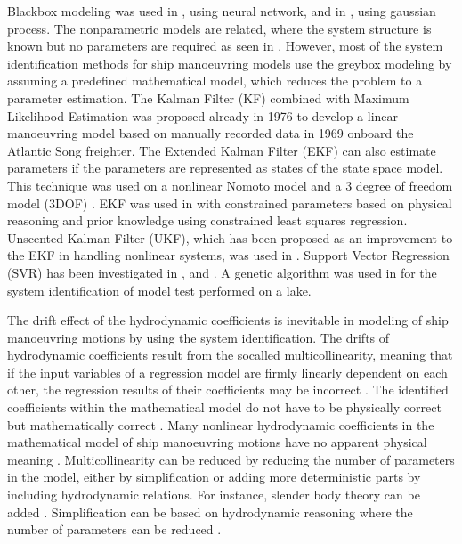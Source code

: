 \documentclass[review]{elsarticle}
\begin{document}
\sphinxAtStartPar
Black\sphinxhyphen{}box modeling was used in \cite{he_nonparametric_2022}, using neural network, and in \cite{xue_identification_2021}, using gaussian process. The nonparametric models are related, where the system structure is known but no parameters are required as seen in \cite{pongduang_nonparametric_2020}. However, most of the system identification methods for ship manoeuvring models use the grey\sphinxhyphen{}box modeling by assuming a predefined mathematical model, which reduces the problem to a parameter estimation.
The Kalman Filter (KF) combined with Maximum Likelihood Estimation was proposed already in 1976 \cite{astrom_identification_1976} to develop a linear manoeuvring model based on manually recorded data in 1969 onboard the Atlantic Song freighter. The Extended Kalman Filter (EKF) can also estimate parameters if the parameters are represented as states of the state space model. This technique was used on a nonlinear Nomoto model \cite{perera_system_2015} and a 3 degree of freedom model (3DOF) \cite{shi_identification_2009}. EKF was used in \cite{araki_estimating_2012} with constrained parameters based on physical reasoning and prior knowledge using constrained least squares regression. Unscented Kalman Filter (UKF), which has been proposed as an improvement to the EKF in handling nonlinear systems, was used in \cite{revestido_herrero_two-step_2012}.
Support Vector Regression (SVR) has been investigated in \cite{zhu_parameter_2017}, \cite{wang_parameter_2021} and \cite{luo_parameter_2016}. A genetic algorithm was used in \cite{miller_ship_2021} for the system identification of model test performed on a lake.

\sphinxAtStartPar
The drift effect of the hydrodynamic coefficients is inevitable in modeling of ship manoeuvring motions by using the system identification. The drifts of hydrodynamic coefficients result from the so\sphinxhyphen{}called multicollinearity, meaning that if the input variables of a regression model are firmly linearly dependent on each other, the regression results of their coefficients may be incorrect \cite{luo_parameter_2016}. The identified coefficients within the mathematical model do not have to be physically correct but mathematically correct \cite{ittc_maneuvering_2008}. Many nonlinear hydrodynamic coefficients in the mathematical model of ship manoeuvring motions have no apparent physical meaning \cite{luo_parameter_2016}. Multicollinearity can be reduced by reducing the number of parameters in the model, either by simplification or adding more deterministic parts by including hydrodynamic relations. For instance, slender body theory can be added \cite{hwang_cancellation_1982}. Simplification can be based on hydrodynamic reasoning where the number of parameters can be reduced \cite{luo_parameter_2016}.
\end{document}
